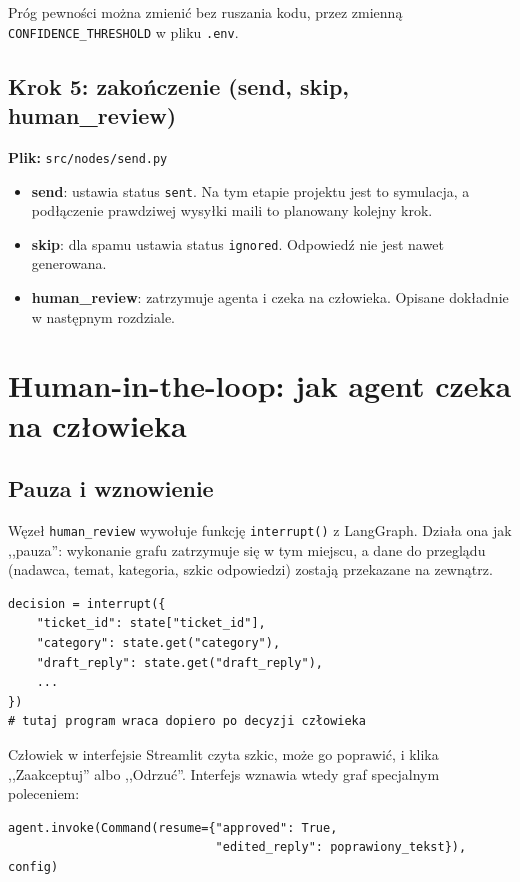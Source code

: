 \documentclass[11pt,a4paper]{article}
\newcommand{\plik}[1]{\texttt{#1}}
\begin{document}
Próg pewności można zmienić bez ruszania kodu, przez zmienną
\texttt{CONFIDENCE\_THRESHOLD} w pliku \plik{.env}.

\subsection{Krok 5: zakończenie (send, skip, human\_review)}

\textbf{Plik:} \plik{src/nodes/send.py}

\begin{itemize}
  \item \textbf{send}: ustawia status \texttt{sent}. Na tym etapie projektu
        jest to symulacja, a podłączenie prawdziwej wysyłki maili to
        planowany kolejny krok.
  \item \textbf{skip}: dla spamu ustawia status \texttt{ignored}. Odpowiedź
        nie jest nawet generowana.
  \item \textbf{human\_review}: zatrzymuje agenta i czeka na człowieka.
        Opisane dokładnie w następnym rozdziale.
\end{itemize}

\section{Human-in-the-loop: jak agent czeka na człowieka}

\subsection{Pauza i wznowienie}

Węzeł \texttt{human\_review} wywołuje funkcję \texttt{interrupt()}
z LangGraph. Działa ona jak ,,pauza'': wykonanie grafu zatrzymuje się w tym
miejscu, a dane do przeglądu (nadawca, temat, kategoria, szkic odpowiedzi)
zostają przekazane na zewnątrz.

\begin{lstlisting}
decision = interrupt({
    "ticket_id": state["ticket_id"],
    "category": state.get("category"),
    "draft_reply": state.get("draft_reply"),
    ...
})
# tutaj program wraca dopiero po decyzji człowieka
\end{lstlisting}

Człowiek w interfejsie Streamlit czyta szkic, może go poprawić, i klika
,,Zaakceptuj'' albo ,,Odrzuć''. Interfejs wznawia wtedy graf specjalnym
poleceniem:

\begin{lstlisting}
agent.invoke(Command(resume={"approved": True,
                             "edited_reply": poprawiony_tekst}), config)
\end{lstlisting}
\end{document}

